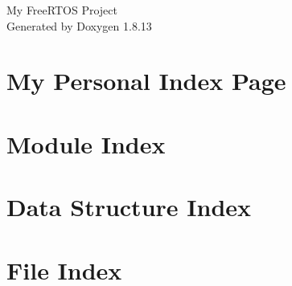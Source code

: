 \documentclass[twoside]{book}
\newcommand{\+}{\discretionary{\mbox{\scriptsize$\hookleftarrow$}}{}{}}
\newcommand{\clearemptydoublepage}{%
  \newpage{\pagestyle{empty}\cleardoublepage}%
}
\begin{document}
\hypersetup{pageanchor=false,
             bookmarksnumbered=true,
             pdfencoding=unicode
            }
\begin{titlepage}
\vspace*{7cm}
\begin{center}%
{\Large My Free\+R\+T\+OS Project }\\
\vspace*{1cm}
{\large Generated by Doxygen 1.8.13}\\
\end{center}
\end{titlepage}
\clearemptydoublepage
{}
\tableofcontents
\clearemptydoublepage
{}
\hypersetup{pageanchor=true}

\chapter{My Personal Index Page}
\label{index}\hypertarget{index}{}
\chapter{Module Index}

\chapter{Data Structure Index}

\chapter{File Index}

\end{document}
